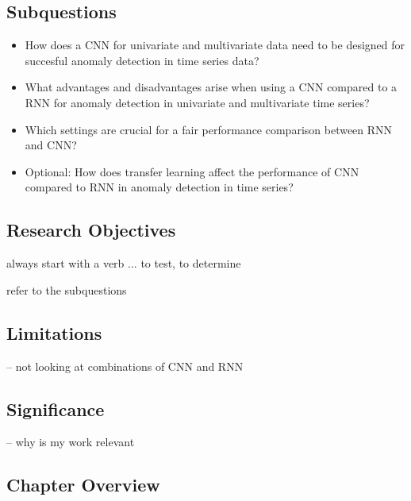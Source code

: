 \subsection{Subquestions}

\begin{itemize}
	\item How does a CNN for univariate and multivariate data need to be designed for succesful anomaly detection in time series data?
	\item What advantages and disadvantages arise when using a CNN compared to a RNN for anomaly detection in univariate and multivariate time series?
	\item Which settings are crucial for a fair performance comparison between RNN and CNN? 
	\item Optional: How does transfer learning affect the performance of CNN compared to RNN in anomaly detection in time series?
\end{itemize}



 
\subsection{Research Objectives}

always start with a verb ... to test, to determine

refer to the subquestions

\subsection{Limitations}

-- not looking at combinations of CNN and RNN

\subsection{Significance}

-- why is my work relevant

\subsection{Chapter Overview}


